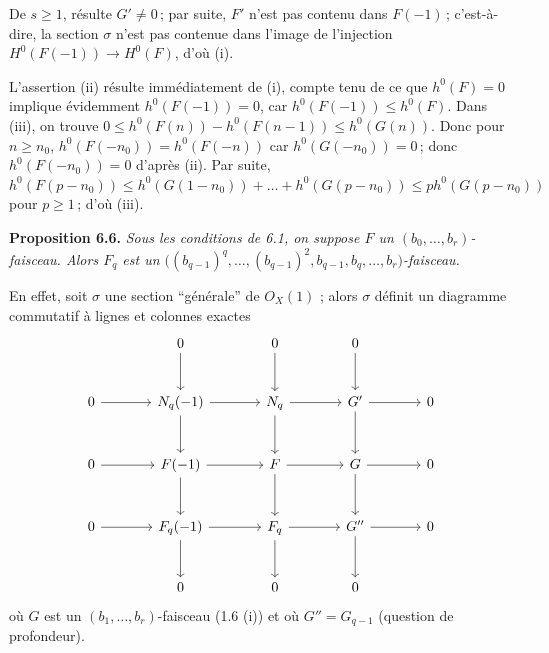 
De $s\ge1$, r\'esulte $G'\ne0$\,; par suite, $F'$ n'est pas contenu dans $F(-1)$\,; c'est-\`a-dire, la section $\sigma$ n'est pas contenue dans l'image de l'injection $H^0(F(-1))\to H^0(F)$, d'o\`u (i).

L'assertion (ii) r\'esulte imm\'ediatement de (i), compte tenu de ce que $h^0(F)=0$ implique \'evidemment $h^0(F(-1))=0$, car $h^0(F(-1))\le h^0(F)$. Dans (iii), on trouve $0\le h^0(F(n))-h^0(F(n-1))\le h^0(G(n))$. Donc pour $n\ge n_0$, $h^0(F(-n_0))=h^0(F(-n))$ car $h^0(G(-n_0))=0$\,; donc $h^0(F(-n_0))=0$ d'apr\`es (ii). Par suite, $h^0(F(p-n_0))\le h^0(G(1-n_0))+\ldots+h^0(G(p-n_0))\le ph^0(G(p-n_0))$ pour $p\ge1$\,; d'o\`u (iii).

\textbf{Proposition 6.6.} \emph{Sous les conditions de 6.1, on suppose $F$ un $(b_0,\ldots,b_r)$-faisceau. Alors $F_q$ est un $\bigl((b_{q-1})^q,\ldots,(b_{q-1})^2,b_{q-1},b_q,\ldots,b_r\bigr)$-faisceau.}

En effet, soit $\sigma$ une section ``g\'en\'erale'' de ${O}_X(1)$ ; alors $\sigma$ d\'efinit un diagramme commutatif \`a lignes et colonnes exactes
\[
\begin{tikzcd}[column sep=large,row sep=large]
&0 \arrow[d]&0 \arrow[d]&0 \arrow[d]&\\
0 \arrow[r]&N_q(-1) \arrow[r] \arrow[d]&N_q \arrow[r] \arrow[d]&G' \arrow[r] \arrow[d]&0\\
0 \arrow[r]&F(-1) \arrow[r] \arrow[d]&F \arrow[r] \arrow[d]&G \arrow[r] \arrow[d]&0\\
0 \arrow[r]&F_q(-1) \arrow[r] \arrow[d]&F_q \arrow[r] \arrow[d]&G'' \arrow[r] \arrow[d]&0\\
&0&0&0&
\end{tikzcd}
\]
o\`u $G$ est un $(b_1,\ldots,b_r)$-faisceau (1.6 (i)) et o\`u $G''=G_{q-1}$ (question de profondeur).
